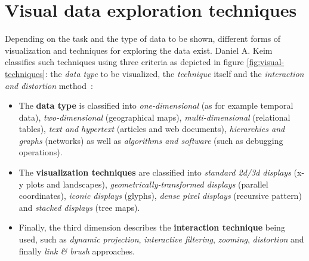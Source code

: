 \section{Visual data exploration techniques}
\label{vis-data-techniques}

Depending on the task and the type of data to be shown, different forms of visualization and techniques for exploring the data exist. Daniel A. Keim~\cite{keim2001vis} classifies such techniques using three criteria as depicted in figure \ref{fig:visual-techniques}: the \textit{data type} to be visualized, the \textit{technique} itself and the \textit{interaction and distortion} method~\cite{Delort10vis}:

\begin{itemize}

\item The \textbf{data type} is classified into \textit{one-dimensional} (as for example temporal data), \textit{two-dimensional} (geographical maps), \textit{multi-dimensional} (relational tables), \textit{text and hypertext} (articles and web documents), \textit{hierarchies and graphs} (networks) as well as \textit{algorithms and software} (such as debugging operations).

\item The \textbf{visualization techniques} are classified into \textit{standard 2d/3d displays} (x-y plots and landscapes), \textit{geometrically-transformed displays} (parallel coordinates), \textit{iconic displays} (glyphs), \textit{dense pixel displays} (recursive pattern) and \textit{stacked displays} (tree maps).

\item Finally, the third dimension describes the \textbf{interaction technique} being used, such as \textit{dynamic projection}, \textit{interactive filtering}, \textit{zooming}, \textit{distortion} and finally \textit{link \& brush} approaches.

\end{itemize}

